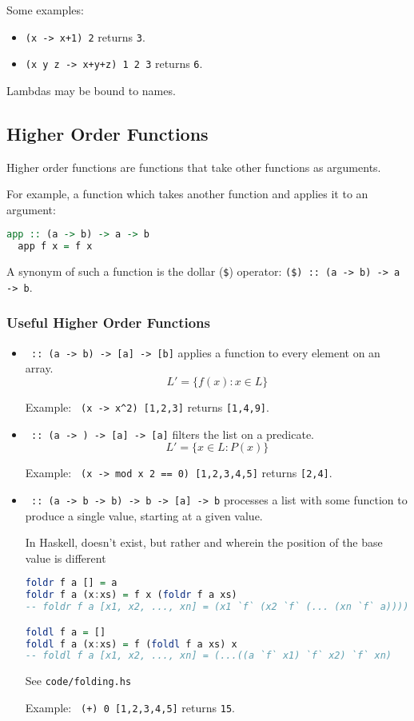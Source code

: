 Some examples:
\begin{itemize}
  \item \texttt{(x -> x+1) 2} returns \texttt{3}.
  \item \texttt{(x y z -> x+y+z) 1 2 3} returns \texttt{6}.
\end{itemize}
Lambdas may be bound to names.

\subsection{Higher Order Functions}
Higher order functions are functions that take other functions as arguments.

For example, a function which takes another function and applies it to an argument:
\begin{lstlisting}[language=haskell]
  app :: (a -> b) -> a -> b
  app f x = f x
\end{lstlisting}
A synonym of such a function is the dollar (\texttt{\$}) operator: \texttt{(\$) :: (a -> b) -> a -> b}.

\subsubsection{Useful Higher Order Functions}
\begin{itemize}
  \item \texttt{ :: (a -> b) -> [a] -> [b]} applies a function to every element on an array.
  \[L' = \{f(x) : x \in L\}\]
  
  Example: \texttt{ (x -> x\string^2) [1,2,3]} returns \texttt{[1,4,9]}.
  \item \texttt{ :: (a -> ) -> [a] -> [a]} filters the list on a predicate.
  \[L' = \{x \in L : P(x)\}\]
  
  Example: \texttt{ (x -> mod x 2 == 0) [1,2,3,4,5]} returns \texttt{[2,4]}.
  \item \texttt{ :: (a -> b -> b) -> b -> [a] -> b} processes a list with some function to produce a single value, starting at a given value.
  
  In Haskell, \texttt{} doesn't exist, but rather \texttt{} and \texttt{} wherein the position of the base value is different

  \begin{lstlisting}[language=haskell]
foldr f a [] = a
foldr f a (x:xs) = f x (foldr f a xs)
-- foldr f a [x1, x2, ..., xn] = (x1 `f` (x2 `f` (... (xn `f` a))))

foldl f a = []
foldl f a (x:xs) = f (foldl f a xs) x
-- foldl f a [x1, x2, ..., xn] = (...((a `f` x1) `f` x2) `f` xn)
  \end{lstlisting}

  See \texttt{code/folding.hs}

  Example: \texttt{ (+) 0 [1,2,3,4,5]} returns \texttt{15}.
\end{itemize}

